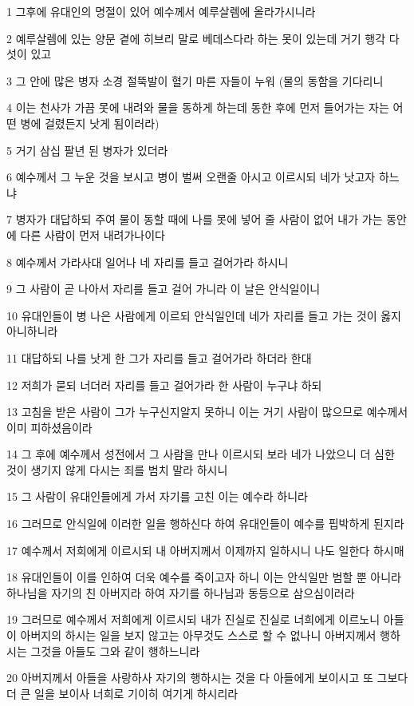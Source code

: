 \par 1 그후에 유대인의 명절이 있어 예수께서 예루살렘에 올라가시니라
\par 2 예루살렘에 있는 양문 곁에 히브리 말로 베데스다라 하는 못이 있는데 거기 행각 다섯이 있고
\par 3 그 안에 많은 병자 소경 절뚝발이 혈기 마른 자들이 누워 (물의 동함을 기다리니
\par 4 이는 천사가 가끔 못에 내려와 물을 동하게 하는데 동한 후에 먼저 들어가는 자는 어떤 병에 걸렸든지 낫게 됨이러라)
\par 5 거기 삼십 팔년 된 병자가 있더라
\par 6 예수께서 그 누운 것을 보시고 병이 벌써 오랜줄 아시고 이르시되 네가 낫고자 하느냐
\par 7 병자가 대답하되 주여 물이 동할 때에 나를 못에 넣어 줄 사람이 없어 내가 가는 동안에 다른 사람이 먼저 내려가나이다
\par 8 예수께서 가라사대 일어나 네 자리를 들고 걸어가라 하시니
\par 9 그 사람이 곧 나아서 자리를 들고 걸어 가니라 이 날은 안식일이니
\par 10 유대인들이 병 나은 사람에게 이르되 안식일인데 네가 자리를 들고 가는 것이 옳지 아니하니라
\par 11 대답하되 나를 낫게 한 그가 자리를 들고 걸어가라 하더라 한대
\par 12 저희가 묻되 너더러 자리를 들고 걸어가라 한 사람이 누구냐 하되
\par 13 고침을 받은 사람이 그가 누구신지알지 못하니 이는 거기 사람이 많으므로 예수께서 이미 피하셨음이라
\par 14 그 후에 예수께서 성전에서 그 사람을 만나 이르시되 보라 네가 나았으니 더 심한 것이 생기지 않게 다시는 죄를 범치 말라 하시니
\par 15 그 사람이 유대인들에게 가서 자기를 고친 이는 예수라 하니라
\par 16 그러므로 안식일에 이러한 일을 행하신다 하여 유대인들이 예수를 핍박하게 된지라
\par 17 예수께서 저희에게 이르시되 내 아버지께서 이제까지 일하시니 나도 일한다 하시매
\par 18 유대인들이 이를 인하여 더욱 예수를 죽이고자 하니 이는 안식일만 범할 뿐 아니라 하나님을 자기의 친 아버지라 하여 자기를 하나님과 동등으로 삼으심이러라
\par 19 그러므로 예수께서 저희에게 이르시되 내가 진실로 진실로 너희에게 이르노니 아들이 아버지의 하시는 일을 보지 않고는 아무것도 스스로 할 수 없나니 아버지께서 행하시는 그것을 아들도 그와 같이 행하느니라
\par 20 아버지께서 아들을 사랑하사 자기의 행하시는 것을 다 아들에게 보이시고 또 그보다 더 큰 일을 보이사 너희로 기이히 여기게 하시리라
